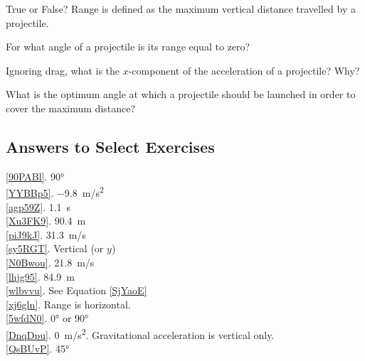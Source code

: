 \documentclass[main.tex]{subfiles}
\begin{document}

\begin{exercise} \label{xj6gln}
    True or False? Range is defined as the maximum vertical distance travelled by a projectile. 
\end{exercise}

\begin{exercise} \label{5wfdN0}
    For what angle of a projectile is its range equal to zero?
\end{exercise}

\begin{exercise} \label{DnqDpu}
    Ignoring drag, what is the $x$-component of the acceleration of a projectile? Why?
\end{exercise}

\begin{exercise} \label{QsBUvP}
    What is the optimum angle at which a projectile should be launched in order to cover the maximum distance?
\end{exercise}

\clearpage

\printnoidxglossaries

\subsection*{Answers to Select Exercises}

\ref{90PABl}. \ang{90}\\
\ref{YYBBp5}. \SI{-9.8}{m/s^2}\\
\ref{agp59Z}. \SI{1.1}{s}\\
\ref{Xu3FK9}. \SI{90.4}{m}\\
\ref{piJ9kJ}. \SI{31.3}{m/s}\\
\ref{sy5RGT}. Vertical (or $y$)\\
\ref{N0Bwou}. \SI{21.8}{m/s}\\
\ref{lhjg95}. \SI{84.9}{m}\\
\ref{wlbvvu}. See Equation \eqref{SjYaoE}\\
\ref{xj6gln}. Range is horizontal.\\
\ref{5wfdN0}. \ang{0} or \ang{90}\\
\ref{DnqDpu}. \SI{0}{m/s^2}. Gravitational acceleration is vertical only.\\
\ref{QsBUvP}. \ang{45}\\
\end{document}
